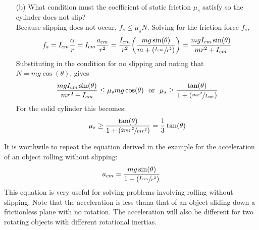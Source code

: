 \documentclass[a4paper]{article}
\begin{document}
\begin{shaded}
\begin{enumerate}
\begin{align*}
        \end{align*}
        \item[(b)] What condition must the coefficient of static friction $\mu_s$ satisfy so the cylinder does not slip?\vspace{2mm}\\
        Because slipping does not occur, $f_s \leq \mu_sN$. Solving for the friction force $f_s$,
        \begin{align*}
            f_s = I_{cm}\frac{\alpha}{r} = I_{cm}\frac{a_{cm}}{r^2} = \frac{I_{cm}}{r^2}\bigg(\frac{mg\sin(\theta)}{m + (\sfrac{I_{cm}}{r^2})}\bigg) = \frac{mgI_{cm}\sin(\theta)}{mr^2 + I_{cm}}
        \end{align*}
        Substituting in the condition for no slipping and noting that $N = mg\cos(\theta)$, gives
        \begin{align*}
            \frac{mgI_{cm}\sin(\theta)}{mr^2 + I_{cm}} \leq \mu_smg\cos(\theta)\ \text{ or }\ \mu_s \geq \frac{\tan(\theta)}{1 + (\sfrac{mr^2}{I_{cm}})}
        \end{align*}
        For the solid cylinder this becomes:
        \begin{align*}
            \mu_s \geq \frac{\tan(\theta)}{1 + (\sfrac{2mr^2}{mr^2})} = \frac{1}{3}\tan(\theta)
        \end{align*}
    \end{enumerate}
\end{shaded}
\newpage\noindent
It is worthwile to repeat the equation derived in the example for the acceleration of an object rolling without slipping:
\begin{equation}
    a_{cm} = \frac{mg\sin(\theta)}{1 + (\sfrac{I_{cm}}{r^2})}
\end{equation}
This equation is very useful for solving problems involving rolling without slipping. Note that the acceleration is less thana that of an object sliding down a frictionless plane with no rotation. The acceleration will also be different for two rotating objects with different rotational inertias.
\end{document}

